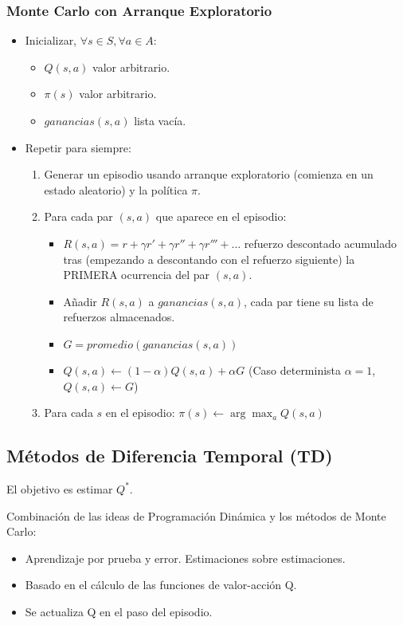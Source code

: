 \documentclass[12pt, twoside, openright]{report} %
\begin{document}
\subsubsection{Monte Carlo con Arranque Exploratorio}
\begin{itemize}
	\item Inicializar, $\forall s \in S, \forall a \in A$:
	      \begin{itemize}
		      \item $Q(s, a)$ valor arbitrario.
		      \item $\pi(s)$ valor arbitrario.
		      \item $ganancias(s, a)$ lista vacía.
	      \end{itemize}
	\item Repetir para siempre:
	      \begin{enumerate}
		      \item Generar un episodio usando arranque exploratorio (comienza en un estado aleatorio) y la política $\pi$.
		      \item Para cada par $(s, a)$ que aparece en el episodio:
		            \begin{itemize}
			            \item $R(s, a) = r + \gamma r'+ \gamma r''+ \gamma r'''+\dots$ refuerzo descontado acumulado tras (empezando a descontando con el refuerzo siguiente) la PRIMERA ocurrencia del par $(s, a)$.
			            \item Añadir $R(s, a)$ a $ganancias(s, a)$, cada par tiene su lista de refuerzos almacenados.
			            \item $G = promedio(ganancias(s, a))$
			            \item $Q(s, a) \leftarrow (1-\alpha)Q(s, a) + \alpha G$ (Caso determinista $\alpha = 1$, $Q(s, a) \leftarrow G$)
		            \end{itemize}
		      \item Para cada $s$ en el episodio: $\pi(s) \leftarrow \arg \max_a Q(s, a)$
	      \end{enumerate}
\end{itemize}

\subsection{Métodos de Diferencia Temporal (TD)}
El objetivo es estimar $Q^*$.

Combinación de las ideas de Programación Dinámica y los métodos de Monte Carlo:
\begin{itemize}
	\item Aprendizaje por prueba y error. Estimaciones sobre estimaciones.
	\item Basado en el cálculo de las funciones de valor-acción Q.
	\item Se actualiza Q en el paso del episodio.
\end{itemize}
\end{document}
